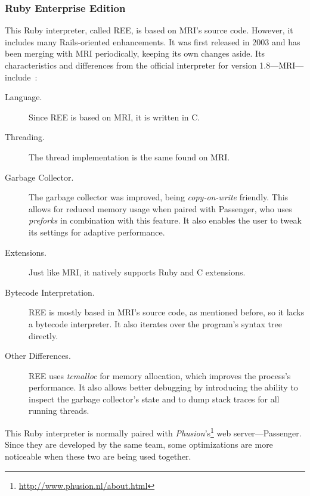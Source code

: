 \subsubsection{Ruby Enterprise Edition}
This Ruby interpreter, called REE, is based on MRI's source code. However, it includes many Rails-oriented enhancements. It was first released in 2003 and has been merging with MRI periodically, keeping its own changes aside. Its characteristics and differences from the official interpreter for version 1.8---MRI---include~\cite{rubyenterpriseedition}:
\begin{description}
\item[Language.] Since REE is based on MRI, it is written in C.
\item[Threading.] The thread implementation is the same found on MRI.
\item[Garbage Collector.]  The garbage collector was improved, being \textit{copy-on-write} friendly. This allows for reduced memory usage when paired with Passenger, who uses \textit{preforks} in combination with this feature.  It also enables the user to tweak its settings for adaptive performance.
\item[Extensions.]  Just like MRI, it natively supports Ruby and C extensions. 
\item[Bytecode Interpretation.] REE is mostly based in MRI's source code, as mentioned before, so it lacks a bytecode interpreter. It also iterates over the program's syntax tree directly.
\item[Other Differences.] REE uses \textit{tcmalloc} for memory allocation, which improves the process's performance. It also allows better debugging by introducing the ability to inspect the garbage collector's state and to dump stack traces for all running threads.
 \end{description}
This Ruby interpreter is normally paired with \textit{Phusion}'s\footnote{\url{http://www.phusion.nl/about.html}} web server---Passenger. Since they are developed by the same team, some optimizations are more noticeable when these two are being used together.


